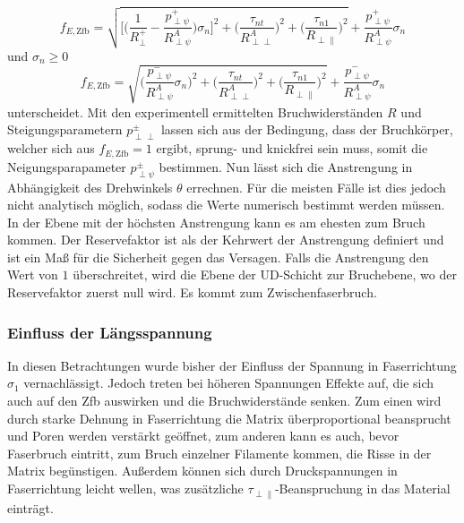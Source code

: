 \begin{equation}\label{Zfb1}
	f_{E,\mathrm{Zfb}} = \sqrt{\biggl[\biggl(\frac{1}{R_{\perp}^+}-\frac{p_{\perp\psi}^+}{R_{\perp\psi}^A}\biggl)\sigma_n\biggl]^2 + \biggl(\frac{\tau_{nt}}{R_{\perp\perp}^A}\biggr)^2 + \biggl(\frac{\tau_{n1}}{R_{\perp\parallel}}\biggr)^2} +  \frac{p_{\perp\psi}^+}{R_{\perp\psi}^A}\sigma_n
\end{equation}
und $\sigma_n \geq 0$
\begin{equation}\label{Zfb2}
	f_{E,\mathrm{Zfb}} = \sqrt{\biggl(\frac{p_{\perp\psi}^-}{R_{\perp\psi}^A}\sigma_n\biggr)^2 + \biggl(\frac{\tau_{nt}}{R_{\perp\perp}^A}\biggr)^2 + \biggl(\frac{\tau_{n1}}{R_{\perp\parallel}}\biggr)^2} +  \frac{p_{\perp\psi}^-}{R_{\perp\psi}^A}\sigma_n
\end{equation}
unterscheidet. Mit den experimentell ermittelten Bruchwiderständen $R$ und Steigungsparametern $p_{\perp\perp}^\pm$ lassen sich aus der Bedingung, dass der Bruchkörper, welcher sich aus $f_{E,\mathrm{Zfb}} = 1$ ergibt, sprung- und knickfrei sein muss, somit die Neigungsparapameter $p_{\perp\psi}^\pm$ bestimmen. Nun lässt sich die Anstrengung in Abhängigkeit des Drehwinkels $\theta$ errechnen. Für die meisten Fälle ist dies jedoch nicht analytisch möglich, sodass die Werte numerisch bestimmt werden müssen. In der Ebene mit der höchsten Anstrengung kann es am ehesten zum Bruch kommen. Der Reservefaktor ist als der Kehrwert der Anstrengung definiert und ist ein Maß für die Sicherheit gegen das Versagen. Falls die Anstrengung den Wert von $1$ überschreitet, wird die Ebene der UD-Schicht zur Bruchebene, wo der Reservefaktor zuerst null wird. Es kommt zum Zwischenfaserbruch.
\subsubsection{Einfluss der Längsspannung}
In diesen Betrachtungen wurde bisher der Einfluss der Spannung in Faserrichtung $\sigma_1$ vernachlässigt. Jedoch treten bei höheren Spannungen Effekte auf, die sich auch auf den Zfb auswirken und die Bruchwiderstände senken. Zum einen wird durch starke Dehnung in Faserrichtung die Matrix überproportional beansprucht und Poren werden verstärkt geöffnet, zum anderen kann es auch, bevor Faserbruch eintritt, zum Bruch einzelner Filamente kommen, die Risse in der Matrix begünstigen. Außerdem können sich durch Druckspannungen in Faserrichtung leicht wellen, was zusätzliche $\tau_{\perp\parallel}$-Beanspruchung in das Material einträgt.

